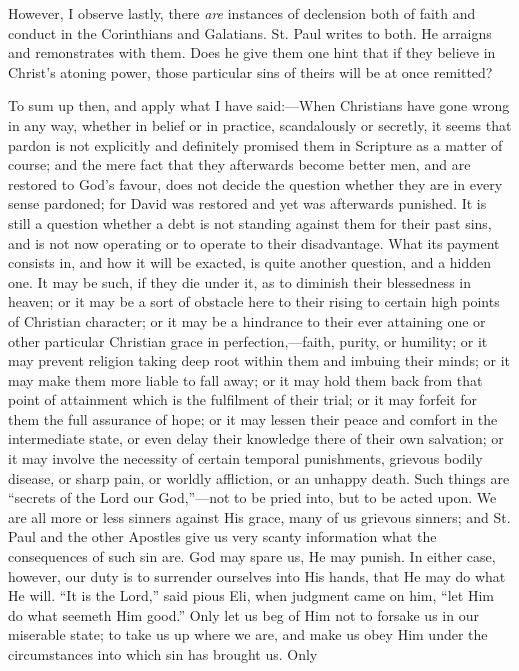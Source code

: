 However, I observe lastly, there \emph{are} instances of declension
both of faith and conduct in the Corinthians and Galatians. St. Paul
writes to both. He arraigns and remonstrates with them. Does he give
them one hint that if they believe in Christ's atoning power, those
particular sins of theirs will be at once remitted?

To sum up then, and apply what I have said:—When Christians have
gone wrong in any way, whether in belief or in practice, scandalously
or secretly, it seems that pardon is not explicitly and definitely
promised them in Scripture as a matter of course; and the mere fact
that they afterwards become better men, and are restored to God's
favour, does not decide the question whether they are in every sense
pardoned; for David was restored and yet was afterwards punished. It
is still a question whether a debt is not standing against them for
their past sins, and is not now operating or to operate to their
disadvantage. What its payment consists in, and how it will be
exacted, is quite another question, and a hidden one. It may be such,
if they die under it, as to diminish their blessedness in heaven; or
it may be a sort of obstacle here to their rising to certain high
points of Christian character; or it may be a hindrance to their ever
attaining one or other particular Christian grace in perfection,—faith,
purity, or humility; or it may prevent religion taking deep root
within them and imbuing their minds; or it may make them more liable
to fall away; or it may hold them back from that point of attainment
which is the fulfilment of their trial; or it may forfeit for them the
full assurance of hope; or it may lessen their peace and comfort in
the intermediate state, or even delay their knowledge there of their
own salvation; or it may involve the necessity of certain temporal
punishments, grievous bodily disease, or sharp pain, or worldly
affliction, or an unhappy death. Such things are ``secrets of the
Lord our God,''—not to be pried into, but to be acted upon. We
are all more or less sinners against His grace, many of us grievous
sinners; and St. Paul and the other Apostles give us very scanty
information what the consequences of such sin are. God may spare us,
He may punish. In either case, however, our duty is to surrender
ourselves into His hands, that He may do what He will. ``It is the
Lord,'' said pious Eli, when judgment came on him, ``let Him
do what seemeth Him good.'' Only let us beg of Him not to forsake
us in our miserable state; to take us up where we are, and make us
obey Him under the circumstances into which sin has brought us. Only
